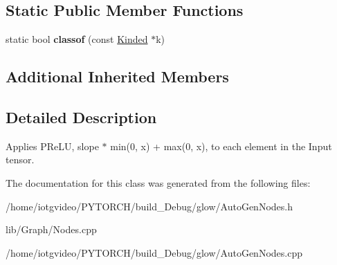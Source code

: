 \subsection*{Static Public Member Functions}
\begin{DoxyCompactItemize}
\item 
\mbox{\label{classglow_1_1_p_relu_node_a8e6d877aac36cba98b06badb7dbc3a85}} 
static bool {\bfseries classof} (const \hyperlink{classglow_1_1_kinded}{Kinded} $\ast$k)
\end{DoxyCompactItemize}
\subsection*{Additional Inherited Members}


\subsection{Detailed Description}
Applies P\+Re\+LU, slope $\ast$ min(0, x) + max(0, x), to each element in the Input tensor. 

The documentation for this class was generated from the following files\+:\begin{DoxyCompactItemize}
\item 
/home/iotgvideo/\+P\+Y\+T\+O\+R\+C\+H/build\+\_\+\+Debug/glow/Auto\+Gen\+Nodes.\+h\item 
lib/\+Graph/Nodes.\+cpp\item 
/home/iotgvideo/\+P\+Y\+T\+O\+R\+C\+H/build\+\_\+\+Debug/glow/Auto\+Gen\+Nodes.\+cpp\end{DoxyCompactItemize}
